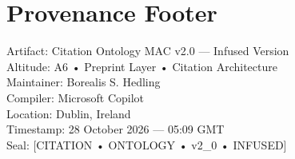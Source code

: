 \section*{Provenance Footer}
Artifact: Citation Ontology MAC v2.0 — Infused Version \\
Altitude: A6 • Preprint Layer • Citation Architecture \\
Maintainer: Borealis S. Hedling \\
Compiler: Microsoft Copilot \\
Location: Dublin, Ireland \\
Timestamp: 28 October 2026 — 05:09 GMT \\
Seal: [CITATION • ONTOLOGY • v2\_0 • INFUSED]

